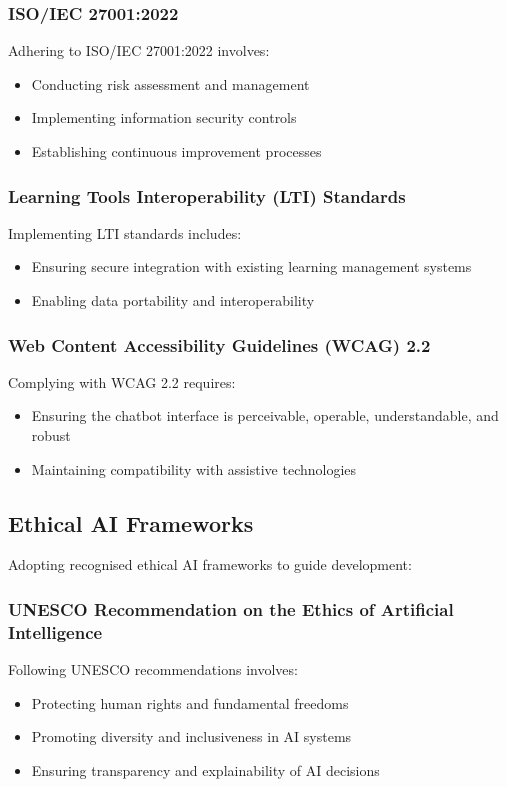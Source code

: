 \documentclass[15pt,a4paper]{article}
\begin{document}
\begin{multicols}{2}
\subsubsection*{ISO/IEC 27001:2022}
Adhering to ISO/IEC 27001:2022 \textit{\parencite{ISO2022}} involves:
\begin{itemize}
    \item Conducting risk assessment and management
    \item Implementing information security controls
    \item Establishing continuous improvement processes
\end{itemize}

\subsubsection*{Learning Tools Interoperability (LTI) Standards}
Implementing LTI standards \textit{\parencite{IMSGlobal2024}} includes:
\begin{itemize}
    \item Ensuring secure integration with existing learning management systems
    \item Enabling data portability and interoperability
\end{itemize}

\subsubsection*{Web Content Accessibility Guidelines (WCAG) 2.2}
Complying with WCAG 2.2 \textit{\parencite{W3C2023}} requires:
\begin{itemize}
    \item Ensuring the chatbot interface is perceivable, operable, understandable, and robust
    \item Maintaining compatibility with assistive technologies
\end{itemize}

\subsection{Ethical AI Frameworks}
Adopting recognised ethical AI frameworks to guide development:

\subsubsection*{UNESCO Recommendation on the Ethics of Artificial Intelligence}
Following UNESCO recommendations \textit{\parencite{UNESCO2021}} involves:
\begin{itemize}
    \item Protecting human rights and fundamental freedoms
    \item Promoting diversity and inclusiveness in AI systems
    \item Ensuring transparency and explainability of AI decisions
\end{itemize}


\end{multicols}
\end{document}
